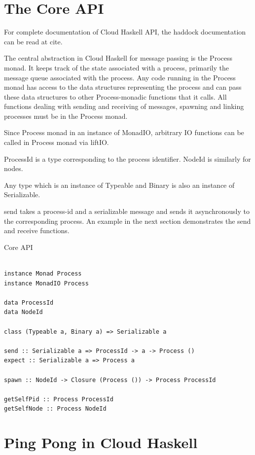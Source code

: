 \section{The Core API}

For complete documentation of Cloud Haskell API, the haddock
documentation can be read at {cite}.

The central abstraction in Cloud Haskell for message passing is the
Process monad. It keeps track of the state associated with a process,
primarily the message queue associated with the process. Any code
running in the Process monad has access to the data structures
representing the process and can pass these data structures to other
Process-monadic functions that it calls. All functions dealing with
sending and receiving of messages, spawning and linking processes must
be in the Process monad.

Since Process monad in an instance of MonadIO, arbitrary IO functions
can be called in Process monad via liftIO.

ProcessId is a type corresponding to the process identifier. NodeId is
similarly for nodes.

Any type which is an instance of Typeable and Binary is also an
instance of Serializable.

send takes a process-id and a serializable message and sends it
asynchronously to the corresponding process.
An example in the next section demonstrates the send and receive
functions.

\begin{program}

\caption[Cloud Haskell API]
{Core API}

\label{fig:cloud-haskell-api}
\begin{verbatim}

instance Monad Process
instance MonadIO Process

data ProcessId
data NodeId

class (Typeable a, Binary a) => Serializable a

send :: Serializable a => ProcessId -> a -> Process ()
expect :: Serializable a => Process a

spawn :: NodeId -> Closure (Process ()) -> Process ProcessId

getSelfPid :: Process ProcessId
getSelfNode :: Process NodeId

\end{verbatim}
\end{program}


\section{Ping Pong in Cloud Haskell}

